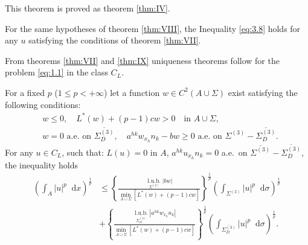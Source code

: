 \documentclass[a4paper,12pt,leqno]{article}
\numberwithin{equation}{section}
\newenvironment{thm}[1]
{\renewcommand\theinnerproblem{#1}\innerproblem}
{\endinnerproblem}
\newcommand{\dd}{\mathop{}\!\mathrm{d}}
\newcommand{\ovdir}{\overline{\Sigma_{D}^{(3)}}}
\begin{document}
This theorem is proved as theorem \ref{thm:IV}.

\begin{thm}{X}
	For the same hypotheses of theorem \ref{thm:VIII}, the Inequality \eqref{eq:3.8} holds for any $u$ satisfying the conditions of theorem \ref{thm:VII}.
\end{thm}

From theorems \ref{thm:VII} and \ref{thm:IX} uniqueness theorems follow for the problem \eqref{eq:1.1} in the class $C_{L}$.

\begin{thm}{XI} \label{thm:XI}
	For a fixed $p$ ($1 \leq p<+\infty$) let a function $w \in C^{2}(A \cup \Sigma)$ exist satisfying the following conditions:
	\begin{equation*}
		\begin{aligned}
			&w \leq 0, \quad L^{*}(w)+(p-1) c w>0 \quad \text{in } A \cup \Sigma, \\
			&w=0 \text{ a.e.\ on } \ovdir,\quad a^{h k} w_{x_{h}} n_{k}-b w \geq 0 \text{ a.e.\ on } \Sigma^{(3)}-\ovdir .
		\end{aligned}
	\end{equation*}
	For any $u\in C_L$, such that: $L(u)=0$ in $A$, $a^{h k} u_{x_{h}}n_{k}=0$ a.e.\ on $\overline{\Sigma^{(3)}}-\overline{\Sigma_D^{(3)}}$, the inequality holds
	\begin{equation}
		\label{eq:3.9}
		\boxed{
		\begin{aligned}
			\left(\int_A |u|^p \dd x\right)^{\frac 1 p}
			& \leq 
			\left\{\frac{\underset{\Sigma^{(2)}}{\operatorname{l.u.b.}}|bw|}{\underset{A\cup\Sigma}{\min} [L^*(w)+(p-1)cw]}\right\}^{\frac 1 p} \left(\int_{\Sigma^{(2)}} |u|^p \dd\sigma \right)^{\frac 1p} \\
			& + \left\{\frac{\underset{\overline{\Sigma^{(3)}_D}}{\operatorname{l.u.b.}}|a^{hk}w_{x_h}n_k|}{\underset{A\cup\Sigma}{\min} [L^*(w)+(p-1)cw]}\right\}^{\frac 1 p} \left(\int_{\overline{\Sigma^{(3)}_D}} |u|^p \dd\sigma \right)^{\frac 1p}.
		\end{aligned}}
	\end{equation}
\end{thm}
\end{document}
